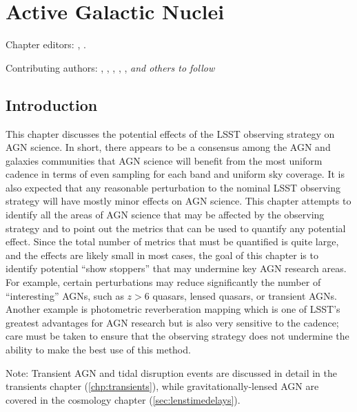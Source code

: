 
\chapter[AGN]{Active Galactic Nuclei}
\def\chpname{agn}\label{chp:\chpname}

Chapter editors:
,
.

Contributing authors:
,
,
,
,
,
{\it and others to follow}


\section{Introduction}
\label{sec:\chpname:intro}


This chapter discusses the potential effects of the LSST observing
strategy on AGN science. In short, there appears to be a consensus
among the AGN and galaxies communities that AGN science will benefit
from the most uniform cadence in terms of even sampling for each band
and uniform sky coverage. It is also expected that any reasonable
perturbation to the nominal LSST observing strategy will have mostly
minor effects on AGN science. This chapter attempts to identify all
the areas of AGN science that may be affected by the observing strategy
and to point out the metrics that can be used to quantify any potential
effect. Since the total number of metrics that must be quantified is
quite large, and the effects are likely small in most cases, the goal
of this chapter is to identify potential ``show stoppers'' that may undermine
key AGN research areas. For example, certain perturbations may reduce
significantly the number of ``interesting'' AGNs, such as $z>6$ quasars,
lensed quasars, or transient AGNs. Another example is photometric
reverberation mapping which is one of LSST's greatest advantages for
AGN research but is also very sensitive to the cadence; care must be
taken to ensure that the observing strategy does not undermine the
ability to make the best use of this method.

Note: Transient AGN and tidal disruption events are discussed in
detail in the transients chapter
(\autoref{chp:transients}), while gravitationally-lensed AGN are
covered in the cosmology chapter (\autoref{sec:lenstimedelays}).


